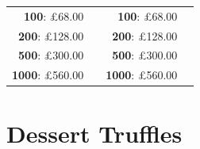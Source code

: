 \documentclass[11pt, english]{article}
\begin{document}
\begin{table}[h]
\begin{center}
\begin{tabular}{r|p{4cm}r|p{4cm}}
		\textbf{100}: \pounds68.00 & & \textbf{100}: \pounds68.00 & \\
		\textbf{200}: \pounds128.00 & & \textbf{200}: \pounds128.00 & \\
		\textbf{500}: \pounds300.00 & & \textbf{500}: \pounds300.00 & \\
		\textbf{1000}: \pounds560.00 & & \textbf{1000}: \pounds560.00 & \\
	\end{tabular}
	\end{center}
	\end{table}

\newpage

\section{Dessert Truffles}
\end{document}
